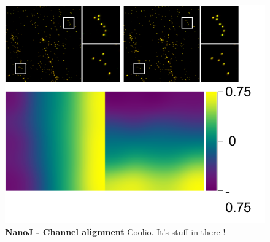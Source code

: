 \begin{figure}[!t]
    \centering
    \includegraphics[width=\linewidth]{Figures/ChannelRealignment_v1.png}
    \caption{\textbf{NanoJ - Channel alignment} Coolio. It's stuff in there !}
    \label{fig:ChannelAlignment}
\end{figure}

